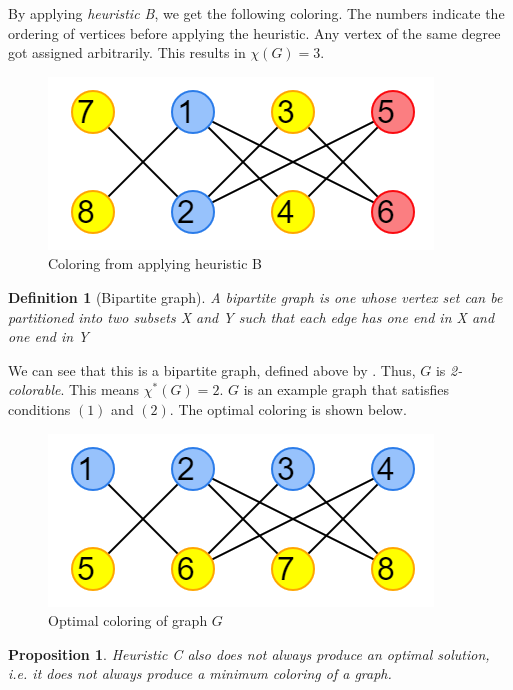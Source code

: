 \documentclass{article}
\newtheorem*{definition}{Definition}
\newtheorem{prop}{Proposition}
\begin{document}
By applying \emph{heuristic B}, we get the following coloring. The numbers indicate the ordering of vertices before applying the heuristic. Any vertex of the same degree got assigned arbitrarily. This results in \(\chi(G) = 3\).

\begin{figure}[H]
\centering
\includegraphics[scale=0.6]{images/graph-2.png}
\caption{Coloring from applying heuristic B}
\end{figure}

\begin{definition}[Bipartite graph]
A bipartite graph is one whose vertex set can be partitioned into two subsets X and Y such that each edge has one end in X and one end in Y
\end{definition}

We can see that this is a bipartite graph, defined above by \cite{bondymurty}. Thus, \(G\) is \emph{2-colorable}. This means \(\chi^{*}(G) = 2\). \(G\) is an example graph that satisfies conditions \((1)\) and \((2)\). The optimal coloring is shown below.

\begin{figure}[H]
\centering
\includegraphics[scale=0.6]{images/graph-3.png}
\caption{Optimal coloring of graph \(G\)}
\end{figure}

\begin{prop}
Heuristic C also does not always produce an optimal solution, i.e. it does not always produce a minimum coloring of a graph.
\end{prop}
\end{document}
